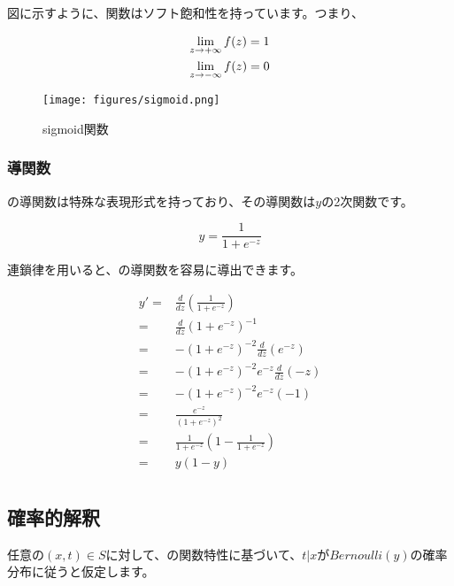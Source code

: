 \begin{content}
図に示すように、関数はソフト飽和性を持っています。つまり、

\[\begin{gathered}
  \mathop {\lim }\limits_{z \to  + \infty } f(z) = 1 \hfill \\
  \mathop {\lim }\limits_{z \to  - \infty } f(z) = 0 \hfill \\ 
\end{gathered} \]

\begin{figure}[H]
\centering
\texttt{[image: figures/sigmoid.png]}
\caption{sigmoid関数}
 \label{fig:sigmoid}
\end{figure}

\subsubsection{導関数}

の導関数は特殊な表現形式を持っており、その導関数は$y$の2次関数です。

\[
y = \frac{1}{{1 + {e^{ - z}}}}
\]

連鎖律を用いると、の導関数を容易に導出できます。

\[\begin{aligned}
  y' =  & \frac{d}{{dz}}\left( {\frac{1}{{1 + {e^{ - z}}}}} \right) \\ 
   =  & \frac{d}{{dz}}{\left( {1 + {e^{ - z}}} \right)^{ - 1}} \\ 
   =  &  - {\left( {1 + {e^{ - z}}} \right)^{ - 2}}\frac{d}{{dz}}\left( {{e^{ - z}}} \right) \\ 
   =  &  - {\left( {1 + {e^{ - z}}} \right)^{ - 2}}{e^{ - z}}\frac{d}{{dz}}\left( { - z} \right) \\ 
   =  &  - {\left( {1 + {e^{ - z}}} \right)^{ - 2}}{e^{ - z}}\left( { - 1} \right) \\ 
   =  & \frac{{{e^{ - z}}}}{{{{\left( {1 + {e^{ - z}}} \right)}^2}}} \\ 
   =  & \frac{1}{{1 + {e^{ - z}}}}\left( {1 - \frac{1}{{1 + {e^{ - z}}}}} \right) \\ 
   =  & y(1 - y) \\ 
\end{aligned} \]

\subsection{確率的解釈}

任意の$(x,t) \in S$に対して、の関数特性に基づいて、$t|x$が$Bernoulli(y)$の確率分布に従うと仮定します。


\end{content}
